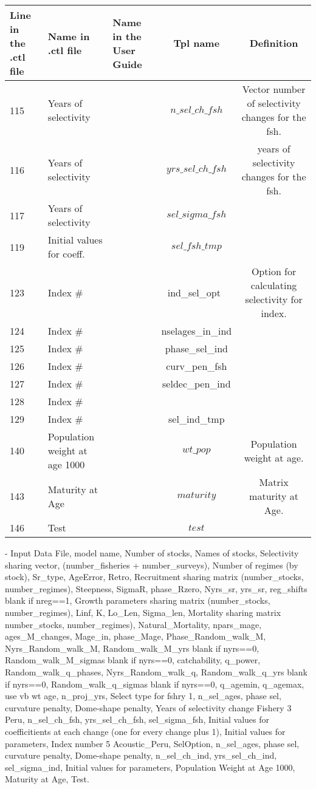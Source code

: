 \documentclass{article}
\begin{document}
\begin{tabular}{| p{0.9cm} | p{4.0cm}  | p{1.9cm} | c | c |}
\hline
Line in the .ctl file & Name in .ctl file  & Name in the User Guide & Tpl name & Definition\\ \hline
115 & Years of selectivity &   & $n\_sel\_ch\_fsh$ & Vector number of selectivity changes for the fsh.\\ \hline
116 & Years of selectivity &   & $yrs\_sel\_ch\_fsh$ & years of selectivity changes for the fsh.\\ \hline
117 & Years of selectivity &   & $sel\_sigma\_fsh$ &\\ \hline
119 & Initial values for coeff. &   & $sel\_fsh\_tmp$ &\\ \hline
123 & Index \# &   & ind\_sel\_opt\ & Option for calculating selectivity for index.\\ \hline
124 & Index \# &   & nselages\_in\_ind &\\ \hline
125 & Index \# &   & phase\_sel\_ind &\\ \hline
126 & Index \# &   & curv\_pen\_fsh &\\ \hline
127 & Index \# &   & seldec\_pen\_ind &\\ \hline
128 & Index \# &   &  &\\ \hline
129 & Index \# &   & sel\_ind\_tmp &\\ \hline
140 & Population weight at age 1000&   & $wt\_pop$ & Population weight at age.\\ \hline
143 & Maturity at Age &   & $maturity$  & Matrix maturity at Age.\\ \hline
146 & Test &   & $test$ &\\ \hline
\end{tabular}


- Input Data File, model name, Number of stocks, Names of stocks, Selectivity sharing vector, (number\_fisheries + number\_surveys), Number of regimes (by stock), Sr\_type, AgeError, Retro, Recruitment sharing matrix (number\_stocks, number\_regimes), Steepness, SigmaR, phase\_Rzero, Nyrs\_sr, yrs\_sr, reg\_shifts blank if nreg==1, Growth parameters sharing matrix (number\_stocks, number\_regimes), Linf, K, Lo\_Len, Sigma\_len, Mortality sharing matrix number\_stocks, number\_regimes), Natural\_Mortality, npars\_mage, ages\_M\_changes, Mage\_in, phase\_Mage, Phase\_Random\_walk\_M, Nyrs\_Random\_walk\_M, Random\_walk\_M\_yrs blank if nyrs==0, Random\_walk\_M\_sigmas blank if nyrs==0, catchability, q\_power, Random\_walk\_q\_phases, Nyrs\_Random\_walk\_q, Random\_walk\_q\_yrs blank if nyrs==0, Random\_walk\_q\_sigmas blank if nyrs==0, q\_agemin, q\_agemax, use vb wt age, n\_proj\_yrs, Select type for fshry 1, n\_sel\_ages, phase sel, curvature penalty, Dome-shape penalty, Years of selectivity change Fishery 3 Peru, n\_sel\_ch\_fsh, yrs\_sel\_ch\_fsh, sel\_sigma\_fsh, Initial values for coefficitients at each change (one for every change plus 1), Initial values for parameters, Index number 5 Acoustic\_Peru, SelOption, n\_sel\_ages, phase sel, curvature penalty, Dome-shape penalty, n\_sel\_ch\_ind, yrs\_sel\_ch\_ind, sel\_sigma\_ind, Initial values for parameters, Population Weight at Age 1000, Maturity at Age, Test.
\end{document}
